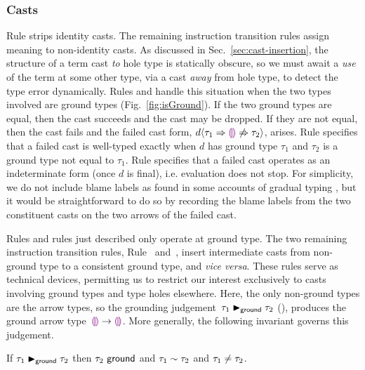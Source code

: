 

\subsubsection{Casts}
Rule  strips identity casts. The remaining instruction
transition rules assign meaning to non-identity casts.
%
As discussed in Sec.~\ref{sec:cast-insertion}, the structure of a term
cast \emph{to} hole type is statically obscure,
%
so we must await a \emph{use} of the term at some other type, via a
cast \emph{away} from hole type, to detect the type error dynamically.
%
Rules  and  handle this situation when the
two types involved are ground types (Fig.~\ref{fig:isGround}).
%
If the two ground types are equal, then the cast succeeds and the cast
may be dropped.
%
If they are not equal, then the cast fails and the failed cast form,
$d \langle{\tau_1}\Rightarrow{\textcolor{violet}{\llparenthesis}\textcolor{violet}{\rrparenthesis}}\not\Rightarrow{\tau_2}\rangle$, arises.
%
Rule  specifies that a failed cast is well-typed exactly
when $d$ has ground type $\tau_1$ and $\tau_2$ is a ground type
not equal to $\tau_1$.
%
Rule  specifies that a failed cast operates as an
indeterminate form (once $d$ is final), i.e. evaluation does not stop. For simplicity, we do not include blame labels as found in some accounts of gradual typing \cite{DBLP:conf/esop/WadlerF09,DBLP:conf/snapl/SiekVCB15}, but it would be straightforward to do so by recording the blame labels from the two constituent casts on the two arrows of the failed cast.

Rules  and  rules just described only operate at ground type.
%
The two remaining instruction transition rules, Rule~
and~, insert intermediate casts from non-ground type to a
consistent ground type, and \emph{vice versa}.
%
These rules serve as technical devices, permitting us to restrict our
interest exclusively to casts involving ground types and type holes elsewhere.
%
Here, the only non-ground types are the arrow types, so the grounding
judgement~$\tau_1 \blacktriangleright_{\mathsf{ground}} \tau_2$ (),
produces the ground arrow type~$\textcolor{violet}{\llparenthesis}\textcolor{violet}{\rrparenthesis} \rightarrow \textcolor{violet}{\llparenthesis}\textcolor{violet}{\rrparenthesis}$.
%
More generally, the following invariant governs this judgement.
\begin{lem}[Grounding]
  If $\tau_1 \blacktriangleright_{\mathsf{ground}} \tau_2$
  then $\tau_2~\mathsf{ground}$
  and $\tau_1 \sim \tau_2$
  and $\tau_1\neq\tau_2$.
\end{lem}

